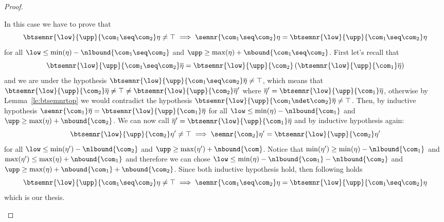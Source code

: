 \begin{proof}
\begin{inductive}
     In this case we have to prove that
    \begin{equation*}
      \btsemnr{\low}{\upp}{\com_1\seq\com_2}\eta \neq \top
      \implies
      \semnr{\com_1 \seq\com_2} \eta = \btsemnr{\low}{\upp}{\com_1 \seq\com_2}\eta
    \end{equation*}
    for all \(\low \leq \min(\eta) -\nlbound{\com_1\seq\com_2}\) and
    \(\upp \geq \max(\eta) + \nbound{\com_1\seq\com_2}\). First let's
    recall that
    \begin{equation*}
      \btsemnr{\low}{\upp}{\com_1\seq\com_2}\overline\eta
      =
      \btsemnr{\low}{\upp}{\com_2}\left(\btsemnr{\low}{\upp}{\com_1}\overline\eta\right)
    \end{equation*}
    and we are under the hypothesis
    \(\btsemnr{\low}{\upp}{\com_1\seq\com_2}\overline\eta \neq \top\),
    which means that
    \(\btsemnr{\low}{\upp}{\com_2}\overline\eta\neq \top \neq
    \btsemnr{\low}{\upp}{\com_2}\overline\eta'\) where
    \(\overline\eta' = \btsemnr{\low}{\upp}{\com_1}\overline\eta\),
    otherwise by Lemma~\ref{le:btsemnrtop} we would contradict the
    hypothesis
    \(\btsemnr{\low}{\upp}{\com_1\ndet\com_2}\overline\eta\neq\top\).
    Then, by inductive hypothesis
    \(\semnr{\com_1}\overline\eta =
    \btsemnr{\low}{\upp}{\com_1}\overline\eta\) for all
    \(\low \leq \min(\eta) - \nlbound{\com_1}\) and
    \(\upp \geq \max(\eta) + \nbound{\com_2}\). We can now call
    \(\overline\eta' = \btsemnr{\low}{\upp}{\com_1}\overline\eta\) and
    by inductive hypothesis again:
    \begin{equation*}
      \btsemnr{\low}{\upp}{\com_2}\eta' \neq \top
      \implies
      \semnr{\com_2}\eta' = \btsemnr{\low}{\upp}{\com_2}\eta'
    \end{equation*}
    for all \(\low \leq \min(\eta') - \nlbound{\com_2}\) and
    \(\upp \geq \max(\eta') + \nbound{\com}\). Notice that
    \(\min(\eta') \geq \min(\eta) - \nlbound{\com_1}\) and
    \(\max(\eta') \leq \max(\eta) + \nbound{\com_1}\) and therefore we
    can chose
    \(\low \leq \min(\eta) - \nlbound{\com_1} - \nlbound{\com_2}\) and
    \(\upp \geq \max(\eta) + \nbound{\com_1} + \nbound{\com_2}\). Since
    both inductive hypothesis hold, then following holds
    \begin{equation*}
      \btsemnr{\low}{\upp}{\com_1\seq\com_2}\eta \neq \top
      \implies
      \semnr{\com_1\seq\com_2}\eta = \btsemnr{\low}{\upp}{\com_1\seq\com_2}\eta
    \end{equation*}
    which is our thesis.
    

\end{inductive}
\end{proof}

